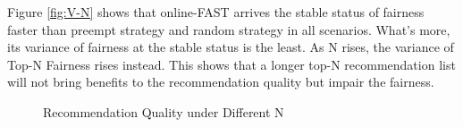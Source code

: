  Figure \ref{fig:V-N} shows that online-FAST arrives the stable status of fairness faster than preempt strategy and random strategy in all scenarios. What's more, its variance of fairness at the stable status is the least. As N rises, the variance of Top-N Fairness rises instead. This shows that a longer top-N recommendation list will
not bring benefits to the recommendation quality but impair the
fairness.

\begin{figure}[h]
\centering
{}%
\quad
{}%
\quad
{}%
\quad
{}%
\quad
{}%
\centering
\caption{Recommendation Quality under Different N}
\label{fig:RQ-N}
\end{figure}



